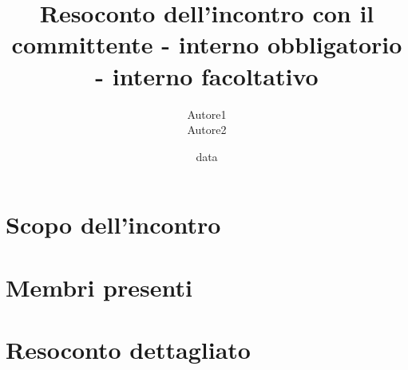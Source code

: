 \documentclass[11pt,a4paper]{article}
\title{Resoconto dell'incontro con il committente - interno obbligatorio - interno facoltativo}
\author{Autore1 \\ Autore2}
\date{data}
\begin{document}
\maketitle
\section{Scopo dell'incontro}
\section{Membri presenti}
\section{Resoconto dettagliato}
\end{document}
